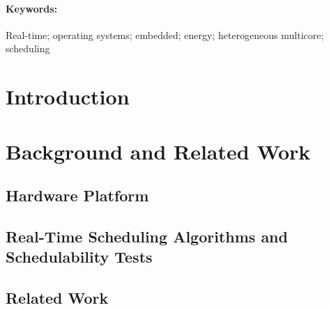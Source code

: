 \documentclass[10pt,letterpaper]{article}
\begin{document}
\paragraph{Keywords:} 
Real-time; operating systems; embedded; energy; heterogeneous multicore; scheduling

\newpage 

\section{Introduction}
\label{sec:intro}



\section{Background and Related Work}
\label{sec:motivation}



\subsection{Hardware Platform}
\label{sec:hardware}



\subsection{Real-Time Scheduling Algorithms and Schedulability Tests}
\label{sec:model}




\subsection{Related Work}
\label{sec:relatedwork}

\end{document}
